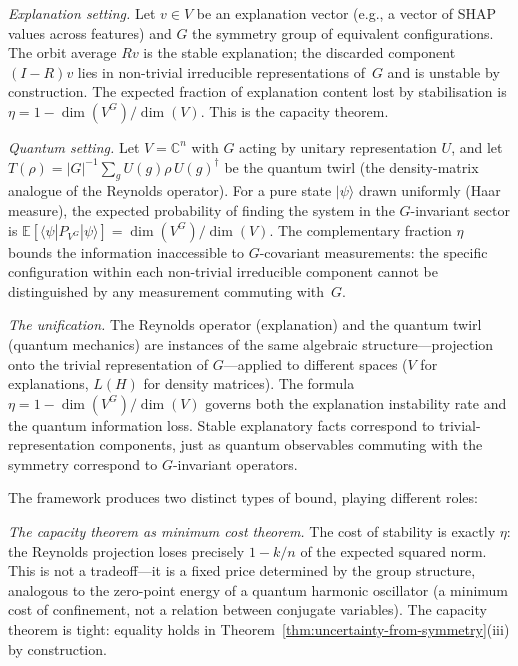 \documentclass[11pt,a4paper]{article}
\begin{document}
\emph{Explanation setting.}  Let $v \in V$ be an explanation vector (e.g., a vector of SHAP values across features) and $G$ the symmetry group of equivalent configurations.  The orbit average $Rv$ is the stable explanation; the discarded component $(I - R)v$ lies in non-trivial irreducible representations of~$G$ and is unstable by construction.  The expected fraction of explanation content lost by stabilisation is $\eta = 1 - \dim(V^G)/\dim(V)$.  This is the capacity theorem.

\emph{Quantum setting.}  Let $V = \mathbb{C}^n$ with $G$ acting by unitary representation $U$, and let $T(\rho) = |G|^{-1} \sum_g U(g)\rho\, U(g)^\dagger$ be the quantum twirl (the density-matrix analogue of the Reynolds operator).  For a pure state $|\psi\rangle$ drawn uniformly (Haar measure), the expected probability of finding the system in the $G$-invariant sector is $\mathbb{E}[\langle\psi|P_{V^G}|\psi\rangle] = \dim(V^G)/\dim(V)$.  The complementary fraction $\eta$ bounds the information inaccessible to $G$-covariant measurements: the specific configuration within each non-trivial irreducible component cannot be distinguished by any measurement commuting with~$G$.

\emph{The unification.}  The Reynolds operator (explanation) and the quantum twirl (quantum mechanics) are instances of the same algebraic structure---projection onto the trivial representation of $G$---applied to different spaces ($V$ for explanations, $L(H)$ for density matrices).  The formula $\eta = 1 - \dim(V^G)/\dim(V)$ governs both the explanation instability rate and the quantum information loss.  Stable explanatory facts correspond to trivial-representation components, just as quantum observables commuting with the symmetry correspond to $G$-invariant operators.

The framework produces two distinct types of bound, playing different roles:

\emph{The capacity theorem as minimum cost theorem.}  The cost of stability is exactly $\eta$: the Reynolds projection loses precisely $1 - k/n$ of the expected squared norm.  This is not a tradeoff---it is a fixed price determined by the group structure, analogous to the zero-point energy of a quantum harmonic oscillator (a minimum cost of confinement, not a relation between conjugate variables).  The capacity theorem is tight: equality holds in Theorem~\ref{thm:uncertainty-from-symmetry}(iii) by construction.
\end{document}
